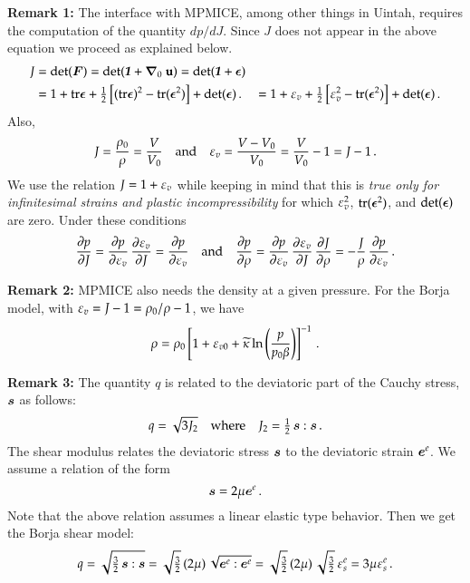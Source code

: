 \documentclass[twoside,10pt,a4paper]{article}
\begin{document}
{\footnotesize
{\bf Remark 1:}  The interface with MPMICE, among other things in Uintah, requires the 
computation of the quantity $dp/dJ$.  Since $J$ does not appear in the above equation we
proceed as explained below.
\[
  \Bal
   J & = \det(\BF) = \det(\Bone + \GradX{\Bu}) = \det(\Bone + \Beps) \\
     & = 1 + \Tr\Beps + \Half\left[(\Tr\Beps)^2 - \Tr(\Beps^2)\right] + \det(\Beps) \,.
     & = 1 + \Ve_v + \Half\left[\Ve_v^2 - \Tr(\Beps^2)\right] + \det(\Beps) \,.
  \Eal
\]
Also,
\[
   J = \frac{\rho_0}{\rho} = \frac{V}{V_0} \quad \Tand \quad
   \Ve_v = \frac{V-V_0}{V_0} = \frac{V}{V_0} - 1 = J - 1 \,.
\]
We use the relation $J = 1 + \Ve_v$ while keeping in mind that this is {\em true only for
infinitesimal strains and plastic incompressibility} for which 
$\Ve_v^2$, $\Tr(\Beps^2)$, and $\det(\Beps)$ are zero.  Under these conditions
\[
   \Partial{p}{J} = \Partial{p}{\Ve_v}\,\Partial{\Ve_v}{J} = \Partial{p}{\Ve_v} \quad \Tand 
   \quad
   \Partial{p}{\rho} = \Partial{p}{\Ve_v}\,\Partial{\Ve_v}{J}\,\Partial{J}{\rho} 
      = -\frac{J}{\rho}\,\Partial{p}{\Ve_v} \,.
\]

{\bf Remark 2:} MPMICE also needs the density at a given pressure.  For the Borja model, with
$\Ve_v = J-1 = \rho_0/\rho -1$, we have
\[
  \rho = \rho_0\left[1 + \Ve_{v0} + \kappatilde\ln\left(\frac{p}{p_0\beta}\right)\right]^{-1}\,.
\]

{\bf Remark 3:}  The quantity $q$ is related to the deviatoric part of the Cauchy stress, $\BsT$
as follows:
\[
   q = \sqrt{3J_2} \quad \text{where} \quad J_2 = \Half\,\BsT:\BsT \,.
\]
The shear modulus relates the deviatoric stress $\BsT$ to the deviatoric strain $\BeT^e$.  We
assume a relation of the form
\[
   \BsT = 2\mu\BeT^e \,.
\]
Note that the above relation assumes a linear elastic type behavior.  Then we get the Borja 
shear model:
\[
  q = \sqrt{\tfrac{3}{2}\,\BsT:\BsT} = \sqrt{\tfrac{3}{2}}\,(2\mu)\,\sqrt{\BeT^e:\BeT^e}
     = \sqrt{\tfrac{3}{2}}\,(2\mu)\,\sqrt{\tfrac{3}{2}}\,\Ve^e_s = 3\mu\Ve^e_s \,.
\]
}
\end{document}
